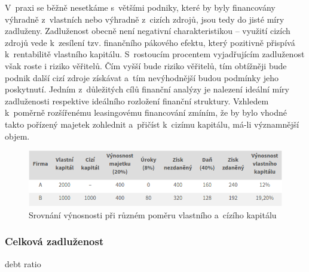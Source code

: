 V~praxi se běžně nesetkáme s~většími podniky, které by byly financovány výhradně z~vlastních nebo výhradně z~cizích zdrojů, jsou tedy do jisté míry zadluženy. Zadluženost obecně není negativní charakteristikou -- využití cizích zdrojů vede k~zesílení tzv. finančního pákového efektu, který pozitivně přispívá k~rentabilitě vlastního kapitálu\cite{kisling}. S~rostoucím procentem vyjadřujícím zadluženost však roste i riziko věřitelů. Čím vyšší bude riziko věřitelů, tím obtížněji bude podnik další cizí zdroje získávat a~tím nevýhodnější budou podmínky jeho poskytnutí\cite{mendelu}. Jedním z~důležitých cílů finanční analýzy je nalezení ideální míry zadluženosti respektive ideálního rozložení finanční struktury. Vzhledem k~poměrně rozšířenému leasingovému financování zmíním, že by bylo vhodné takto pořízený majetek zohlednit a~přičíst k~cizímu kapitálu, má-li významnější objem.

\begin{figure}
  \centering
  \includegraphics[width=15cm]{img/tab.png}
  \caption{Srovnání výnosnosti při různém poměru vlastního a~cízího kapitálu}
\end{figure}



\subsubsection{Celková zadluženost}
debt ratio

